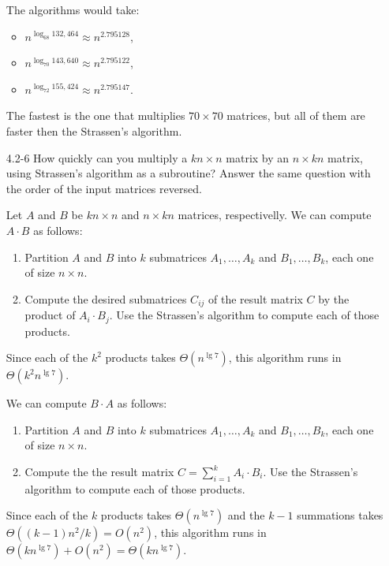 \begin{enumerate}
\begin{framed}
The algorithms would take:
\begin{itemize}
  \item $n^{\log_{68} 132,464} \approx n^{2.795128}$,
  \item $n^{\log_{70} 143,640} \approx n^{2.795122}$,
  \item $n^{\log_{72} 155,424} \approx n^{2.795147}$.
\end{itemize}

The fastest is the one that multiplies $70 \times 70$ matrices, but all of them
are faster then the Strassen's algorithm.
\end{framed}

\item[4.2{-}6]{How quickly can you multiply a $k n \times n$ matrix by an
$n \times k n$ matrix, using Strassen's algorithm as a subroutine? Answer the
same question with the order of the input matrices reversed.}

\begin{framed}
Let $A$ and $B$ be $kn \times n$ and $n \times k n$ matrices, respectivelly. We
can compute $A \cdot B$ as follows:
\begin{enumerate}
\item Partition $A$ and $B$ into $k$ submatrices $A_1, \dots, A_k$ and $B_1,
\dots, B_k$, each one of size $n \times n$.
\item Compute the desired submatrices $C_{ij}$ of the result matrix $C$ by the
product of $A_i \cdot B_j$. Use the Strassen's algorithm to compute each of
those products.
\end{enumerate}

Since each of the $k^2$ products takes $\Theta(n^{\lg 7})$, this algorithm
runs in $\Theta(k^2 n^{\lg 7})$.

We can compute $B \cdot A$ as follows:
\begin{enumerate}
\item Partition $A$ and $B$ into $k$ submatrices $A_1, \dots, A_k$ and $B_1,
\dots, B_k$, each one of size $n \times n$.
\item Compute the the result matrix $C = \sum_{i = 1}^{k} A_i \cdot B_i$.
Use the Strassen's algorithm to compute each of those products.
\end{enumerate}

Since each of the $k$ products takes $\Theta(n^{\lg 7})$ and the $k - 1$
summations takes $\Theta((k - 1) {n^2}/k) = O(n^2)$, this algorithm runs in
$\Theta(k n^{\lg 7}) + O(n^2) = \Theta(k n^{\lg 7})$.


\end{framed}
\end{enumerate}
